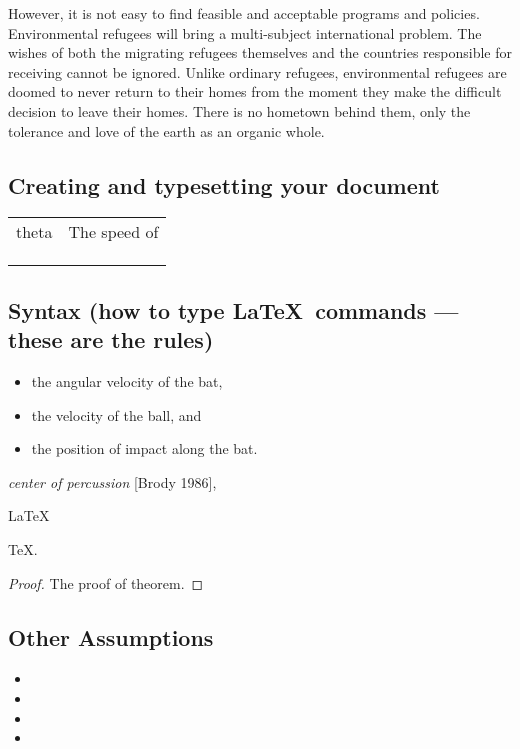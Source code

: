 \documentclass{mcmthesis}
\begin{document}
However, it is not easy to find feasible and acceptable programs and policies. Environmental refugees will bring a multi-subject international problem. The wishes of both the migrating refugees themselves and the countries responsible for receiving cannot be ignored. Unlike ordinary refugees, environmental refugees are doomed to never return to their homes from the moment they make the difficult decision to leave their homes. There is no hometown behind them, only the tolerance and love of the earth as an organic whole.

\subsection{Creating and typesetting your document}
\begin{table}[H]%
	\begin{tabular}{l|l}
		\hline
		theta & The speed of \\
		&              \\
		&              \\
		&              \\ \hline
	\end{tabular}
\end{table}

\subsection{Syntax (how to type \LaTeX\ commands --- these
  are the rules)}

\lipsum[3]
\begin{itemize}%
\item the angular velocity of the bat,
\item the velocity of the ball, and
\item the position of impact along the bat.
\end{itemize}
\lipsum[4]
\emph{center of percussion} [Brody 1986], \lipsum[5]

\begin{Theorem} \label{thm:latex}
\LaTeX
\end{Theorem}
\begin{Lemma} \label{thm:tex}
\TeX .
\end{Lemma}
\begin{proof}%
The proof of theorem.
\end{proof}

\subsection{Other Assumptions}
\lipsum[6]
\begin{itemize}%
\item
\item
\item
\item
\end{itemize}
\end{document}
